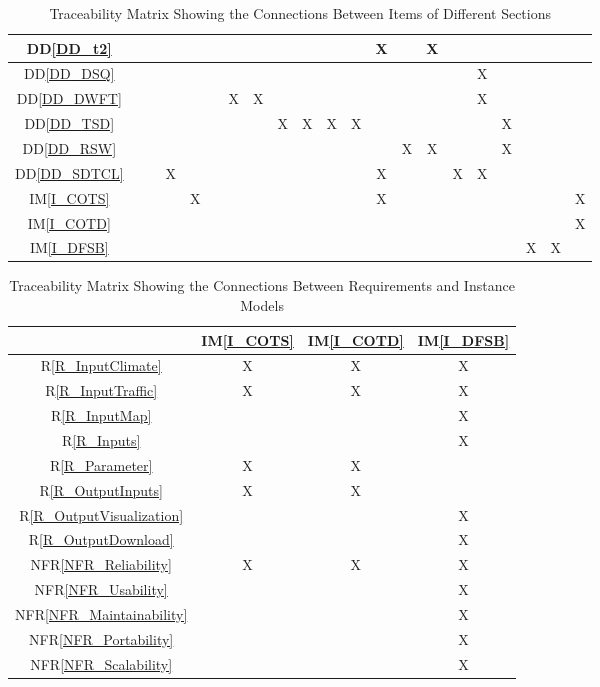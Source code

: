 \documentclass[12pt]{article}
\newcommand{\ddref}[1]{DD\ref{#1}}
\newcommand{\iref}[1]{IM\ref{#1}}
\newcommand{\rref}[1]{R\ref{#1}}
\newcommand{\nfrref}[1]{NFR\ref{#1}}
\begin{document}
\begin{landscape}
\begin{table}[h]
\begin{tabular}{|c|c|c|c|c|c|c|c|c|c|c|c|c|c|c|c|c|c|c|c|c|}
\ddref{DD_t2}        &  &  &  & & &  & &  &  &  &  & X & &  X &  & &&  & & \\ \hline
\ddref{DD_DSQ}     &  &  &  & & &  & &  &  &  &  & & &  &  & X &&  & &  \\ \hline
\ddref{DD_DWFT}     &  &  &  & & & X & X &  &  &  &  & & &  &  & X &&  & & \\ \hline
\ddref{DD_TSD}     &  &  &  & & &  & & X & X & X & X & & &  &  & &X&  & & \\ \hline
\ddref{DD_RSW}      &  &  &  & & &  & &  &  &  &  & & X & X &  & &X&  & & \\ \hline
\ddref{DD_SDTCL}    &  &  & X & & &  & &  &  &  &  & X & &  &  X&X &&  & & \\ \hline
\iref{I_COTS}        &  &  &  & X & &  & &  &  &  &  &  X & &  &  & &&  & & X \\ \hline
\iref{I_COTD}        &  &  &  & & &  & &  &  &  &  & & &  &  & &&  & & X \\ \hline
\iref{I_DFSB}       &  &  &  & & &  & &  &  &  &  & & &  &  & &&  X & X & \\ \hline
\hline
\end{tabular}
\caption{Traceability Matrix Showing the Connections Between Items of Different Sections}
\label{Table:A_trace}
\end{table}
 \end{landscape}

\newpage
\begin{table}[H]
\centering
\begin{tabular}{|c|c|c|c|}
\hline 
	& \iref{I_COTS} & \iref{I_COTD} & \iref{I_DFSB}  \\

\hline
\rref{R_InputClimate} & X & X & X \\ \hline
\rref{R_InputTraffic} & X & X & X \\ \hline
\rref{R_InputMap} & & & X  \\ \hline
\rref{R_Inputs}     & & & X \\ \hline
\rref{R_Parameter} & X & X &  \\ \hline
\rref{R_OutputInputs} & X  &X & \\ \hline
\rref{R_OutputVisualization} & & & X\\ \hline
\rref{R_OutputDownload} &  & & X\\ \hline
\nfrref{NFR_Reliability}   & X & X & X \\ \hline
\nfrref{NFR_Usability}   & & & X \\ \hline
\nfrref{NFR_Maintainability}   & & & X \\ \hline
\nfrref{NFR_Portability}   & & & X \\ \hline
\nfrref{NFR_Scalability}   & & & X \\
\hline
\end{tabular}
\caption{Traceability Matrix Showing the Connections Between Requirements and Instance Models}
\label{Table:R_trace}
\end{table}
\end{document}

